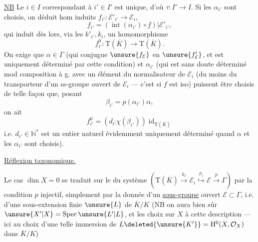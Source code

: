 \uline{NB} Le $i\in I$ correspondant à $i'\in I'$ est unique, d'où $\tau:I'\longrightarrow I$.
Si les $\alpha_{i'}$ sont choisis, on déduit  hom induits
$f_{i'}:\mathcal E'_{i'}\longrightarrow\mathcal E_i$,
\[
f_{i'}=(\operatorname{int}(\alpha_{i'})\circ f)|\mathcal E'_{i'},
\]
qui induit dès lors, via les $k'_{i'},k_i$, un homomorphisme
\[
f^0_{i'}:\mathrm T(\overline K)\longrightarrow\mathrm T(\overline K).
\]
On exige que $\alpha\in\Gamma$ (qui conjugue $\unsure{f_{\mathcal E}}$ en $\unsure{f'_{\mathcal E}}$, et est  uniquement déterminé par cette condition) et $\alpha_{i'}$ (qui est sans doute déterminé mod  composition à g. avec un élément du normalisateur de $\mathcal E_i$ (du moins du transporteur  d'un ss-groupe ouvert de $\mathcal E_i$ --- c'est  si $f$ est iso) puissent être choisis de telle façon que, posant
\[
\beta_{i'}=p(\alpha_{i'})\alpha,
\]
on ait
\[
f^0_{i'}=(d_{i'}\chi(\beta_{i'}))\operatorname{id}_{\mathrm T(\overline K)}
\]
i.e. $d_{i'}\in\mathbb N^*$ est un entier naturel évidemment uniquement déterminé \unsure{\}} quand $\alpha$ et les $\alpha_{i'}$ sont choisis).


 \uline{Réflexion taxonomique.}

Le cas $\dim X=0$ se traduit sur le  du système
$(\mathrm T(\overline K)\xrightarrow{k_i}\mathcal E_i\overset{\rho_i}{\hookrightarrow}\mathcal E\xrightarrow{p}\Gamma)$
 par la condition  $p$ injectif,  
simplement par la donnée d'un \uline{sous-groupe} ouvert $\mathcal E\subset\Gamma$, i.e. d'une sous-extension finie $\unsure{L}$ de $\overline K/K$
(NB on aura bien sûr $\unsure{X'|X}=\operatorname{Spec}\unsure{L'|L}$, et les choix  sur $X$   à cette description ---  ici au choix d'une telle immersion de $L\deleted{\unsure{K'}}=\mathrm H^0(X,\mathcal O_X)$ dans $\overline K/K$)

